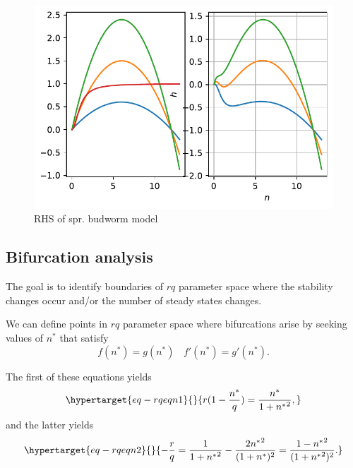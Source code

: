 \documentclass[
  letterpaper,
  DIV=11,
  numbers=noendperiod]{scrreprt}
\begin{document}
\begin{figure}

{\centering \includegraphics{SinglePopODEMOdels_files/figure-pdf/fig-sprucebudworm-rhsfg-output-1.pdf}

}

\caption{\label{fig-sprucebudworm-rhsfg}RHS of spr. budworm model}

\end{figure}

\hypertarget{bifurcation-analysis}{%
\subsection{Bifurcation analysis}\label{bifurcation-analysis}}

The goal is to identify boundaries of \(rq\) parameter space where the
stability changes occur and/or the number of steady states changes.

We can define points in \(rq\) parameter space where bifurcations arise
by seeking values of \(n^*\) that satisfy \[
f(n^*)= g(n^*) \ \ \ \  f'(n^*)= g'(n^*).
\]

The first of these equations yields
\begin{equation}\protect\hypertarget{eq-rqeqn1}{}{
  r(1-\frac{n^*}{q}) = \frac{n^*}{1+n{^*}^{2}},
}\label{eq-rqeqn1}\end{equation} and the latter yields
\begin{equation}\protect\hypertarget{eq-rqeqn2}{}{
 -\frac{r}{q}=\frac{1}{1+n{^*}^{2}}-\frac{2n{^*}^{2}}{(1+n{^*})^2} = \frac{1-n{^*}^{2}}{(1+n{^*}^{2})^2}.
}\label{eq-rqeqn2}\end{equation}
\end{document}
